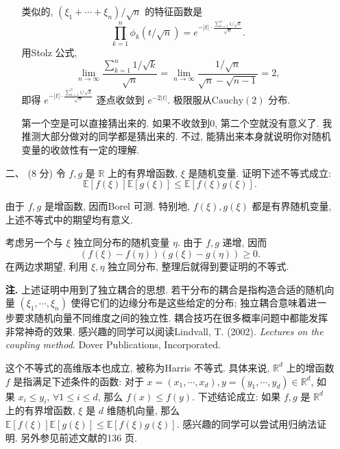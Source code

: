 \begin{enumerate}
\begin{proofc}[解答]
\begin{enumerate}[label=(\arabic*)]
类似的, $(\xi_{1}+\cdots+\xi_{n}) / \sqrt{n}$ 的特征函数是
\[
\prod_{k=1}^{n} \phi_{k}(t / \sqrt{n})=e^{-|t| \cdot \frac{\sum_{k=1}^{n} 1 / \sqrt{k}}{\sqrt{n}}} .
\]
用Stolz 公式,
\[
\lim_{n \to \infty} \frac{\sum_{k=1}^{n} 1/\sqrt{k}}{\sqrt{n}}=\lim _{n \to \infty} \frac{1 / \sqrt{n}}{\sqrt{n}-\sqrt{n-1}}=2,
\]
即得 $e^{-|t| \cdot \frac{\sum_{k=1}^{n} 1 / \sqrt{k}}{\sqrt{n}}}$ 逐点收敛到 $e^{-2|t|}$. 极限服从$\text{Cauchy}(2)$ 分布.

第一个空是可以直接猜出来的. 如果不收敛到$0$, 第二个空就没有意义了. 我推测大部分做对的同学都是猜出来的. 不过, 能猜出来本身就说明你对随机变量的收敛性有一定的理解.\qedhere
        \end{enumerate}
    \end{proofc}

    \item[二、](8 分)
    令 $f, g$ 是 $\mathbb{R}$ 上的有界增函数, $\xi$ 是随机变量. 证明下述不等式成立:
$$
\mathbb{E}[f(\xi)]\mathbb{E}[g(\xi)]\leq \mathbb{E}[f(\xi)g(\xi)].
$$
    \begin{proofc}
        由于 $f, g$ 是增函数, 因而Borel 可测. 特别地, $f(\xi), g(\xi)$ 都是有界随机变量, 上述不等式中的期望均有意义.

考虑另一个与 $\xi$ 独立同分布的随机变量 $\eta$. 由于 $f, g$ 递增, 因而
\[
(f(\xi)-f(\eta))(g(\xi)-g(\eta)) \geq 0 .
\]
在两边求期望, 利用 $\xi, \eta$ 独立同分布, 整理后就得到要证明的不等式.

\textbf{注.} 上述证明中用到了独立耦合的思想. 若干分布的耦合是指构造合适的随机向量 $(\xi_{1}, \cdots, \xi_{n})$ 使得它们的边缘分布是这些给定的分布; 独立耦合意味着进一步要求随机向量不同维度之间的独立性. 
耦合技巧在很多概率问题中都能发挥非常神奇的效果. 感兴趣的同学可以阅读Lindvall, T. (2002). \textit{Lectures on the coupling method}. Dover Publications, Incorporated.

这个不等式的高维版本也成立, 被称为Harris 不等式. 具体来说, $\mathbb{R}^{d}$ 上的增函数 $f$ 是指满足下述条件的函数: 对于 $x=(x_{1}, \cdots, x_{d}), y=(y_{1}, \cdots, y_{d}) \in \mathbb{R}^{d}$, 如果 $x_{i} \leq y_{i}$, $\forall 1 \leq i \leq d$, 那么 $f(x) \leq f(y)$. 
下述结论成立: 如果 $f, g$ 是 $\mathbb{R}^{d}$ 上的有界增函数, $\xi$ 是 $d$ 维随机向量, 那么 $\mathbb{E}[f(\xi)] \mathbb{E}[g(\xi)] \leq \mathbb{E}[f(\xi) g(\xi)]$. 感兴趣的同学可以尝试用归纳法证明. 另外参见前述文献的136 页.


\end{proofc}
\end{enumerate}
